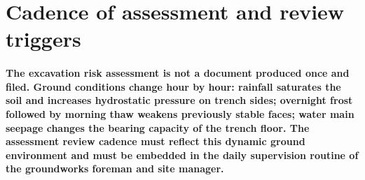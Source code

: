 \section{Cadence of assessment and review triggers}

\paragraph{The excavation risk assessment is not a document produced once and filed. Ground conditions change hour by hour: rainfall saturates the soil and increases hydrostatic pressure on trench sides; overnight frost followed by morning thaw weakens previously stable faces; water main seepage changes the bearing capacity of the trench floor. The assessment review cadence must reflect this dynamic ground environment and must be embedded in the daily supervision routine of the groundworks foreman and site manager.}

